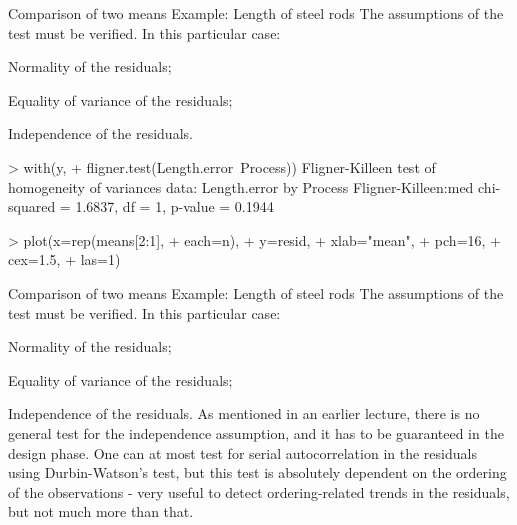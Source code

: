 \documentclass[t]{beamer}
\begin{document}

\begin{ftstf}
{Comparison of two means}
{Example: Length of steel rods}
The assumptions of the test must be verified. In this particular case:

\bitems Normality of the residuals;
\item \alert{Equality of variance of the residuals};
\item Independence of the residuals.
\eitem
\begin{rcode}
> with(y,
+      fligner.test(Length.error~Process))
Fligner-Killeen test of homogeneity of variances
data:  Length.error by Process
Fligner-Killeen:med chi-squared = 1.6837, 
df = 1, p-value = 0.1944

> plot(x=rep(means[2:1],
+            each=n),
+      y=resid,
+      xlab="mean",
+      pch=16,
+      cex=1.5,
+      las=1)
\end{rcode}
\end{ftstf}


\begin{ftst}
{Comparison of two means}
{Example: Length of steel rods}
The assumptions of the test must be verified. In this particular case:

\bitems Normality of the residuals;
\item Equality of variance of the residuals;
\item \alert{Independence of the residuals}.
\eitem
As mentioned in an earlier lecture, there is no general test for the independence assumption, and it has to be guaranteed in the design phase. 
\vhalf
One can at most test for serial autocorrelation in the residuals using Durbin-Watson's test, but this test is absolutely dependent on the ordering of the observations - very useful to detect ordering-related trends in the residuals, but not much more than that.
\end{ftst}
\end{document}
